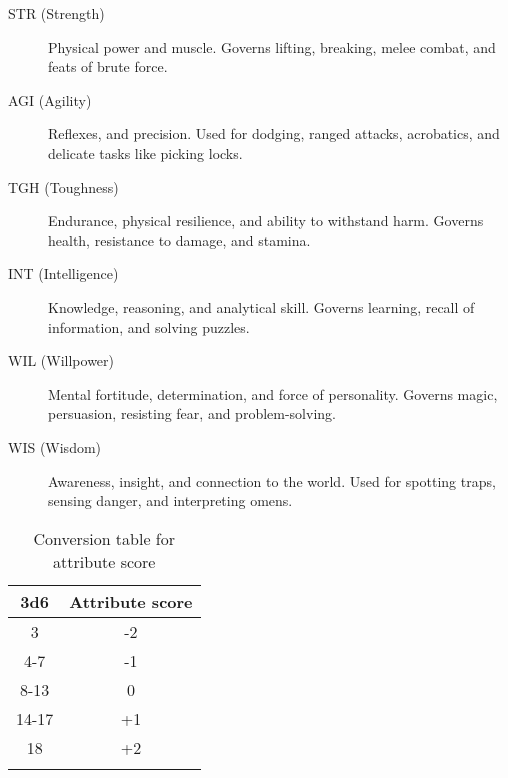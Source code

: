 \documentclass[itdr/core]{subfiles}
\begin{document}
\begin{description}
\item[STR (Strength)] Physical power and muscle. Governs lifting, breaking, melee combat, and feats of brute force.
\item[AGI (Agility)] Reflexes, and precision. Used for dodging, ranged attacks, acrobatics, and delicate tasks like picking locks.
\item[TGH (Toughness)] Endurance, physical resilience, and ability to withstand harm. Governs health, resistance to damage, and stamina.
\item[INT (Intelligence)] Knowledge, reasoning, and analytical skill. Governs learning, recall of information, and solving puzzles.
\item[WIL (Willpower)] Mental fortitude, determination, and force of personality. Governs magic, persuasion, resisting fear, and problem-solving.
\item[WIS (Wisdom)] Awareness, insight, and connection to the world. Used for spotting traps, sensing danger, and interpreting omens.
\end{description}

\begin{longtable}{cc}
\hline
\textbf{3d6} & \textbf{Attribute score} \\
\hline
3 & -2 \\
4-7 & -1 \\
8-13 & 0 \\
14-17 & +1 \\
18 & +2 \\
\hline
\caption{Conversion table for attribute score}
\label{table:attribute-conversion}
\end{longtable}
\end{document}
